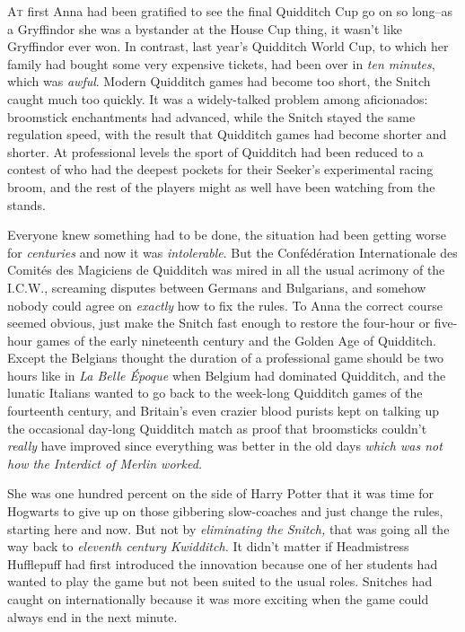 
\lettrine{A}{t} first Anna had been gratified to see the final Quidditch Cup go on so long\---as a Gryffindor she was a bystander at the House Cup thing, it wasn't like Gryffindor ever won. In contrast, last year's Quidditch World Cup, to which her family had bought some very expensive tickets, had been over in \emph{ten minutes}, which was \emph{awful}. Modern Quidditch games had become too short, the Snitch caught much too quickly. It was a widely-talked problem among aficionados: broomstick enchantments had advanced, while the Snitch stayed the same regulation speed, with the result that Quidditch games had become shorter and shorter. At professional levels the sport of Quidditch had been reduced to a contest of who had the deepest pockets for their Seeker's experimental racing broom, and the rest of the players might as well have been watching from the stands.

Everyone knew something had to be done, the situation had been getting worse for \emph{centuries} and now it was \emph{intolerable}. But the Confédération Internationale des Comités des Magiciens de Quidditch was mired in all the usual acrimony of the I.C.W., screaming disputes between Germans and Bulgarians, and somehow nobody could agree on \emph{exactly} how to fix the rules. To Anna the correct course seemed obvious, just make the Snitch fast enough to restore the four-hour or five-hour games of the early nineteenth century and the Golden Age of Quidditch. Except the Belgians thought the duration of a professional game should be two hours like in \emph{La Belle Époque} when Belgium had dominated Quidditch, and the lunatic Italians wanted to go back to the week-long Quidditch games of the fourteenth century, and Britain's even crazier blood purists kept on talking up the occasional day-long Quidditch match as proof that broomsticks couldn't \emph{really} have improved since everything was better in the old days \emph{which was not how the Interdict of Merlin worked.}

She was one hundred percent on the side of Harry Potter that it was time for Hogwarts to give up on those gibbering slow-coaches and just change the rules, starting here and now. But not by \emph{eliminating the Snitch,} that was going all the way back to \emph{eleventh century Kwidditch.} It didn't matter if Headmistress Hufflepuff had first introduced the innovation because one of her students had wanted to play the game but not been suited to the usual roles. Snitches had caught on internationally because it was more exciting when the game could always end in the next minute.

